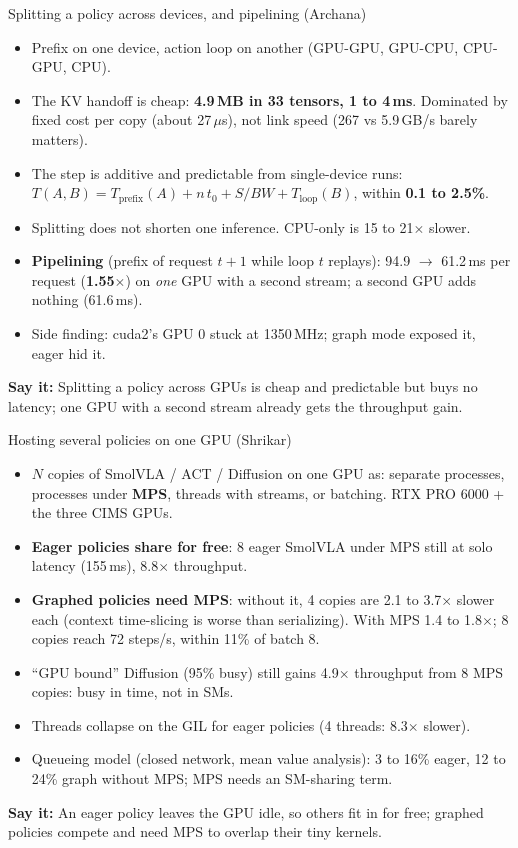 \documentclass[aspectratio=169,10pt]{beamer}
\newcommand{\say}[1]{\par\vfill\noindent\colorbox{soft}{\parbox{\dimexpr\textwidth-2\fboxsep\relax}{\small\textbf{\textcolor{accent}{Say it:}} #1}}}
\begin{document}
\begin{frame}{Splitting a policy across devices, and pipelining (Archana)}
\begin{itemize}
\item Prefix on one device, action loop on another (GPU-GPU, GPU-CPU, CPU-GPU, CPU).
\item The KV handoff is cheap: \textbf{4.9\,MB in 33 tensors, 1 to 4\,ms}. Dominated by fixed
  cost per copy (about 27\,$\mu$s), not link speed (267 vs 5.9\,GB/s barely matters).
\item The step is additive and predictable from single-device runs:
  $T(A,B) = T_{\mathrm{prefix}}(A) + n\,t_0 + S/BW + T_{\mathrm{loop}}(B)$, within
  \textbf{0.1 to 2.5\%}.
\item Splitting does not shorten one inference. CPU-only is 15 to 21$\times$ slower.
\item \textbf{Pipelining} (prefix of request $t{+}1$ while loop $t$ replays): 94.9 $\rightarrow$
  61.2\,ms per request (\textbf{1.55$\times$}) on \emph{one} GPU with a second stream; a second
  GPU adds nothing (61.6\,ms).
\item Side finding: cuda2's GPU 0 stuck at 1350\,MHz; graph mode exposed it, eager hid it.
\end{itemize}
\say{Splitting a policy across GPUs is cheap and predictable but buys no latency; one GPU with
a second stream already gets the throughput gain.}
\end{frame}

\begin{frame}{Hosting several policies on one GPU (Shrikar)}
\begin{itemize}
\item $N$ copies of SmolVLA / ACT / Diffusion on one GPU as: separate processes, processes
  under \textbf{MPS}, threads with streams, or batching. RTX PRO 6000 + the three CIMS GPUs.
\item \textbf{Eager policies share for free}: 8 eager SmolVLA under MPS still at solo latency
  (155\,ms), 8.8$\times$ throughput.
\item \textbf{Graphed policies need MPS}: without it, 4 copies are 2.1 to 3.7$\times$ slower each
  (context time-slicing is worse than serializing). With MPS 1.4 to 1.8$\times$; 8 copies reach
  72 steps/s, within 11\% of batch 8.
\item ``GPU bound'' Diffusion (95\% busy) still gains 4.9$\times$ throughput from 8 MPS copies:
  busy in time, not in SMs.
\item Threads collapse on the GIL for eager policies (4 threads: 8.3$\times$ slower).
\item Queueing model (closed network, mean value analysis): 3 to 16\% eager, 12 to 24\% graph
  without MPS; MPS needs an SM-sharing term.
\end{itemize}
\say{An eager policy leaves the GPU idle, so others fit in for free; graphed policies compete
and need MPS to overlap their tiny kernels.}
\end{frame}
\end{document}
